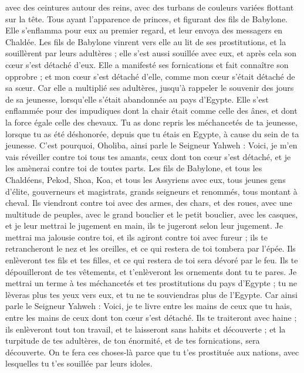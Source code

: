 \begin{multicols}{2}
avec des ceintures autour des reins, avec des turbans de couleurs variées flottant sur la tête. Tous ayant l'apparence de princes, et figurant des fils de Babylone.
Elle s'enflamma pour eux au premier regard, et leur envoya des messagers en Chaldée.
Les fils de Babylone vinrent vers elle au lit de ses prostitutions, et la souillèrent par leurs adultères ; elle s'est aussi souillée avec eux, et après cela son cœur s'est détaché d'eux.
Elle a manifesté ses fornications et fait connaître son opprobre ; et mon cœur s'est détaché d'elle, comme mon cœur s'était détaché de sa sœur.
Car elle a multiplié ses adultères, jusqu'à rappeler le souvenir des jours de sa jeunesse, lorsqu'elle s'était abandonnée au pays d'Egypte.
Elle s'est enflammée pour des impudiques dont la chair était comme celle des ânes, et dont la force égale celle des chevaux.
Tu as donc repris les méchancetés de ta jeunesse, lorsque tu as été déshonorée, depuis que tu étais en Egypte, à cause du sein de ta jeunesse.
C'est pourquoi, Oholiba, ainsi parle le Seigneur Yahweh : Voici, je m'en vais réveiller contre toi tous tes amants, ceux dont ton cœur s'est détaché, et je les amènerai contre toi de toutes parts.
Les fils de Babylone, et tous les Chaldéens, Pekod, Shoa, Koa, et tous les Assyriens avec eux, tous jeunes gens d'élite, gouverneurs et magistrats, grands seigneurs et renommés, tous montant à cheval.
Ils viendront contre toi avec des armes, des chars, et des roues, avec une multitude de peuples, avec le grand bouclier et le petit bouclier, avec les casques, et je leur mettrai le jugement en main, ils te jugeront selon leur jugement.
Je mettrai ma jalousie contre toi, et ils agiront contre toi avec fureur ; ils te retrancheront le nez et les oreilles, et ce qui restera de toi tombera par l'épée. Ils enlèveront tes fils et tes filles, et ce qui restera de toi sera dévoré par le feu.
Ils te dépouilleront de tes vêtements, et t'enlèveront les ornements dont tu te pares.
Je mettrai un terme à tes méchancetés et tes prostitutions du pays d'Egypte ; tu ne lèveras plus tes yeux vers eux, et tu ne te souviendras plus de l'Egypte.
Car ainsi parle le Seigneur Yahweh : Voici, je te livre entre les mains de ceux que tu hais, entre les mains de ceux dont ton cœur s'est détaché.
Ils te traiteront avec haine ; ils enlèveront tout ton travail, et te laisseront sans habits et découverte ; et la turpitude de tes adultères, de ton énormité, et de tes fornications, sera découverte.
On te fera ces choses-là parce que tu t'es prostituée aux nations, avec lesquelles tu t'es souillée par leurs idoles.

\end{multicols}
